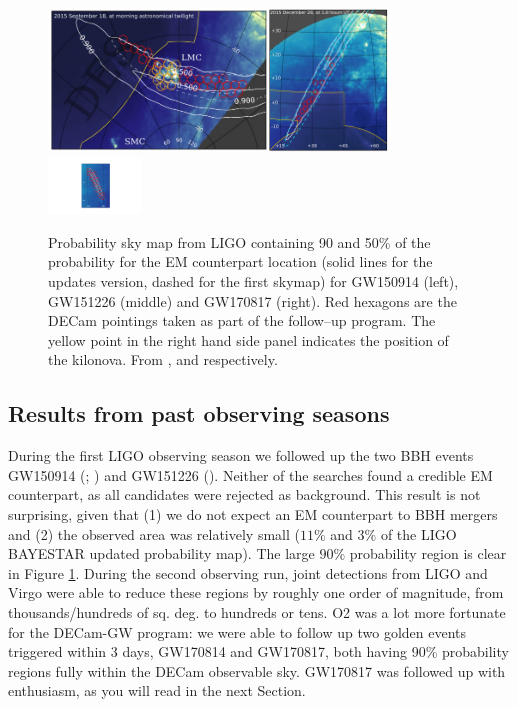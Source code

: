\begin{figure}
\includegraphics[width=0.52\textwidth]{./chapters/chapter3/Figures/1.png}\includegraphics[width=0.29\textwidth]{./chapters/chapter3/Figures/2.png}\includegraphics[width=0.22\textwidth]{./chapters/chapter3/Figures/GW170817_skymap.pdf}
\caption{Probability sky map from LIGO containing 90 and 50\% of the probability for the EM counterpart location (solid lines for the updates version, dashed for the first skymap) for GW150914 (left), GW151226 (middle) and GW170817 (right). Red hexagons are the DECam pointings taken as part of the follow--up program. The yellow point in the right hand side panel indicates the position of the kilonova. From \citet{marcelle16}, \citet{Cowperthwaite16} and \citet{marcelle17} respectively.}\label{fig:skymaps}\end{figure}

\subsection{Results from past observing seasons}
During the first LIGO observing season we followed up the two BBH events GW150914 (\citealt{marcelle16}; \citealt{annis16}) and GW151226 (\citealt{Cowperthwaite16}). Neither of the searches found a credible EM counterpart, as all candidates were rejected as background. This result is not surprising, given that (1) we do not expect an EM counterpart to BBH mergers and (2) the observed area was relatively small ($11\%$ and $3\%$ of the LIGO BAYESTAR updated probability map). The large $90\%$ probability region is clear in Figure \ref{fig:skymaps}. During the second observing run, joint detections from LIGO and Virgo were able to reduce these regions by roughly one order of magnitude, from thousands/hundreds of  sq. deg. to hundreds or tens. O2 was a lot more fortunate for the DECam-GW program: we were able to follow up two golden events triggered within 3 days, GW170814 and GW170817, both having 90\% probability regions fully within the DECam observable sky. GW170817 was followed up with enthusiasm, as you will read in the next Section.

